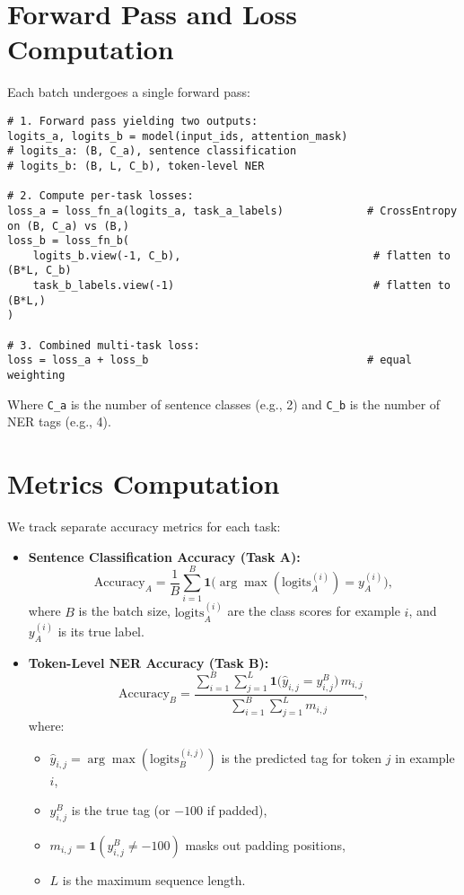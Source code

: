 \documentclass{article}
\begin{document}
\section{Forward Pass and Loss Computation}
Each batch undergoes a single forward pass:
\begin{lstlisting}
# 1. Forward pass yielding two outputs:
logits_a, logits_b = model(input_ids, attention_mask)
# logits_a: (B, C_a), sentence classification
# logits_b: (B, L, C_b), token-level NER

# 2. Compute per-task losses:
loss_a = loss_fn_a(logits_a, task_a_labels)             # CrossEntropy on (B, C_a) vs (B,)
loss_b = loss_fn_b(
    logits_b.view(-1, C_b),                              # flatten to (B*L, C_b)
    task_b_labels.view(-1)                               # flatten to (B*L,)
)

# 3. Combined multi-task loss:
loss = loss_a + loss_b                                  # equal weighting
\end{lstlisting}
\noindent
Where \texttt{C\_a} is the number of sentence classes (e.g., 2) and \texttt{C\_b} is the number of NER tags (e.g., 4).

\section{Metrics Computation}
We track separate accuracy metrics for each task:

\begin{itemize}
  \item \textbf{Sentence Classification Accuracy (Task A):}
    \[
      \mathrm{Accuracy}_A 
      = \frac{1}{B} \sum_{i=1}^{B}
        \mathbf{1}\bigl(\arg\max(\mathrm{logits}_A^{(i)}) = y_A^{(i)}\bigr),
    \]
    where \(B\) is the batch size, \(\mathrm{logits}_A^{(i)}\) are the class scores for example \(i\), and \(y_A^{(i)}\) is its true label.
  
  \item \textbf{Token-Level NER Accuracy (Task B):}
    \[
      \mathrm{Accuracy}_B
      = \frac{\sum_{i=1}^{B}\sum_{j=1}^{L}
          \mathbf{1}\bigl(\hat y_{i,j} = y_{i,j}^B \bigr)\,m_{i,j}}
         {\sum_{i=1}^{B}\sum_{j=1}^{L} m_{i,j}},
    \]
    where:
    \begin{itemize}
      \item \(\hat y_{i,j} = \arg\max(\mathrm{logits}_B^{(i,j)})\) is the predicted tag for token \(j\) in example \(i\),
      \item \(y_{i,j}^B\) is the true tag (or \(-100\) if padded),
      \item \(m_{i,j} = \mathbf{1}(y_{i,j}^B \neq -100)\) masks out padding positions,
      \item \(L\) is the maximum sequence length.
    \end{itemize}
\end{itemize}
\end{document}
